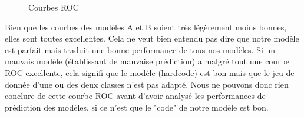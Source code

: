 \documentclass[a4paper,12pt]{report}
\begin{document}
      \begin{figure}[!h]%
        \centering
        \qquad
        \qquad
        \qquad
        \caption{Courbes ROC}%
      \end{figure}%
      \FloatBarrier
      \bigbreak
      Bien que les courbes des modèles A et B soient très légèrement moins bonnes, elles sont toutes excellentes. Cela ne veut bien entendu pas dire que notre modèle est parfait mais traduit une bonne performance de tous nos modèles.
      \medbreak
      Si un mauvais modèle (établissant de mauvaise prédiction) a malgré tout une courbe ROC excellente, cela signifi que le modèle (hardcode) est bon mais que le jeu de donnée d'une ou des deux classes n'est pas adapté.
      \medbreak
      Nous ne pouvons donc rien conclure de cette courbe ROC avant d'avoir analysé les performances de prédiction des modèles, si ce n'est que le "code" de notre modèle est bon.
\end{document}
